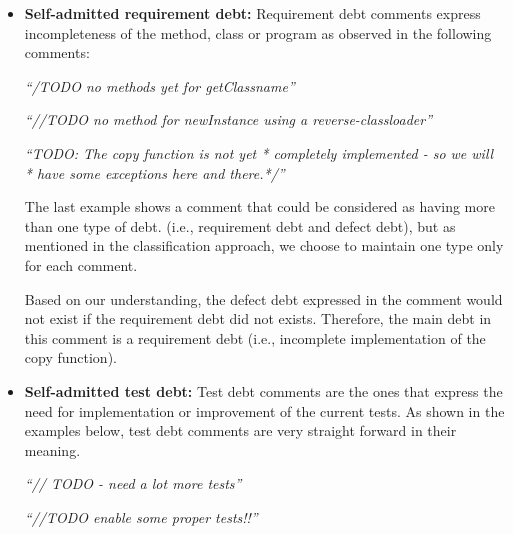 \begin{itemize}
  \item \textbf{Self-admitted requirement debt:} Requirement debt comments express incompleteness of the method, class or program as observed in the following comments:
  
  \begin{displayquote}
  	\textit{``/TODO no methods yet for getClassname''}
  	
  	\vspace{1mm}
  	
  	\textit{``//TODO no method for newInstance using a reverse-classloader''}

  	\vspace{1mm}
  	
  	\textit{``TODO: The copy function is not yet * completely implemented - so we will  * have some exceptions here and there.*/''}  
  	
  \end{displayquote}
  \vspace{1mm}  
  
The last example shows a comment that could be considered as having more than one type of debt. (i.e., requirement debt and defect debt), but as mentioned in the classification approach, we choose to maintain one type only for each comment. 
  	
Based on our understanding, the defect debt expressed in the comment would not exist if the requirement debt did not exists. Therefore, the main debt in this comment is a requirement debt (i.e., incomplete implementation of the copy function). 
  	
  
  \vspace{1mm}
  \item \textbf{Self-admitted test debt:} Test debt comments are the ones that express the need for implementation or improvement of the current tests. As shown in the examples below, test debt comments are very straight forward in their meaning. 
  
  \begin{displayquote}
  	\textit{``// TODO - need a lot more tests''}
  	
  	\vspace{1mm}
  	
  	\textit{``//TODO enable some proper tests!!''}
  \end{displayquote}
  \vspace{1mm}  
    
\end{itemize}


